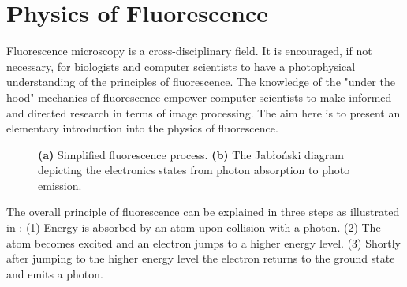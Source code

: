 \section{Physics of Fluorescence}
\label{sec:PhysicsOfFluorescence}

Fluorescence microscopy is a cross-disciplinary field.
It is encouraged, if not necessary, for biologists and computer scientists to have a photophysical understanding of the principles of fluorescence.
The knowledge of the "under the hood" mechanics of fluorescence empower computer scientists to make informed and directed research in terms of image processing.
The aim here is to present an elementary introduction into the physics of fluorescence.

\begin{figure}[!t]
	\centering
	\caption{\textbf{(a)} Simplified fluorescence process. \textbf{(b)} The Jab{\l}o{\'n}ski diagram depicting the electronics states from photon absorption to photo emission.}
	\label{fig:fluorescence_electron_states}
\end{figure}

The overall principle of fluorescence can be explained in three steps \citep{Nobel2016} as illustrated in : 
(1) Energy is absorbed by an atom upon collision with a photon.
(2) The atom becomes excited and an electron jumps to a higher energy level.
(3) Shortly after jumping to the higher energy level the electron returns to the ground state and emits a photon.

